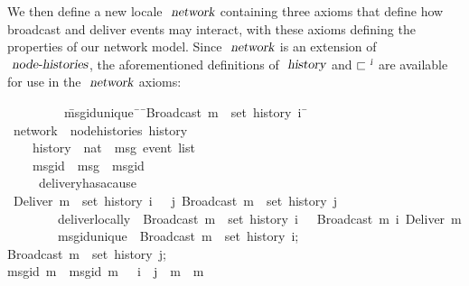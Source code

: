 We then define a new locale $\isa{network}$ containing three axioms that define how broadcast and deliver events may interact, with these axioms defining the properties of our network model.
Since $\isa{network}$ is an extension of $\isa{node-histories}$, the aforementioned definitions of $\isa{history}$ and $\sqsubset^\isa{i}$ are available for use in the $\isa{network}$ axioms:
\begin{isabelle}
~~~~~~~~\ \=msg{\isacharunderscore}id{\isacharunderscore}unique{\isacharcolon}\ \={\isasymrbrakk}\ \={\isachardoublequoteopen}Broadcast\ m\ {\isasymin}\ set\ {\isacharparenleft}history\ i{\isacharparenright}\ \=\kill
{}\ network\ {\isacharequal}\ node{\isacharunderscore}histories\ history\\
~~~~\>history\ {\isacharcolon}{\isacharcolon}\ {\isachardoublequoteopen}nat\ {\isasymRightarrow}\ {\isacharprime}msg\ event\ list{\isachardoublequoteclose}\ {\isacharplus}\\
~~~~\>msg{\isacharunderscore}id\ {\isacharcolon}{\isacharcolon}\ {\isachardoublequoteopen}{\isacharprime}msg\ {\isasymRightarrow}\ {\isacharprime}msgid{\isachardoublequoteclose}\\
~~~~\ delivery{\isacharunderscore}has{\isacharunderscore}a{\isacharunderscore}cause{\isacharcolon}\\
\>\>{\isasymlbrakk}\ {\isachardoublequoteopen}Deliver\ m\ {\isasymin}\ set\ {\isacharparenleft}history\ i{\isacharparenright}\ \>\>{\isasymrbrakk}\ {\isasymLongrightarrow}\ {\isasymexists}j{\isachardot}\ Broadcast\ m\ {\isasymin}\ set\ {\isacharparenleft}history\ j{\isacharparenright}{\isachardoublequoteclose}\\
~~~~~~~~\>deliver{\isacharunderscore}locally{\isacharcolon}\ \>{\isasymlbrakk}\ \>{\isachardoublequoteopen}Broadcast\ m\ {\isasymin}\ set\ {\isacharparenleft}history\ i{\isacharparenright}\ \>{\isasymrbrakk}\ {\isasymLongrightarrow}\  Broadcast\ m\ {\isasymsqsubset}\isactrlsup i\ Deliver\ m{\isachardoublequoteclose}\\
~~~~~~~~\>msg{\isacharunderscore}id{\isacharunderscore}unique{\isacharcolon}\ \>{\isasymlbrakk}\ \>{\isachardoublequoteopen}Broadcast\ m{}\ {\isasymin}\ set\ {\isacharparenleft}history\ i{\isacharparenright};\\
\>\>\>Broadcast\ m{}\ {\isasymin}\ set\ {\isacharparenleft}history\ j{\isacharparenright};\\
\>\>\>msg{\isacharunderscore}id\ m{}\ {\isacharequal}\ msg{\isacharunderscore}id\ m{}\ \>{\isasymrbrakk}\ {\isasymLongrightarrow}\ i\ {\isacharequal}\ j\ {\isasymand}\ m{}\ {\isacharequal}\ m{}{\isachardoublequoteclose}
\end{isabelle}
